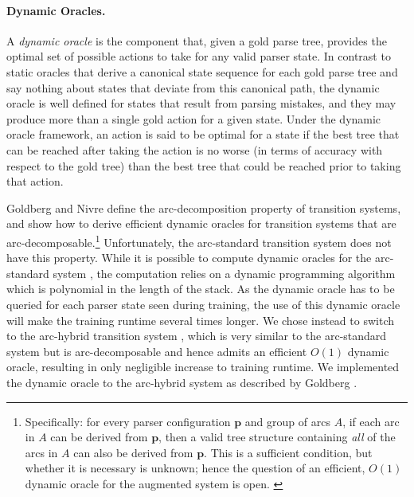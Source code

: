 \documentclass[11pt]{article}
\newcommand{\nascomment}[1]{\textcolor{blue}{\textbf{[#1 --\textsc{nas}]}}}
\newcommand{\ygcomment}[1]{\textcolor{red}{\textbf{[#1 --\textsc{yg}]}}}
\begin{document}
\paragraph{Dynamic Oracles.} A \emph{dynamic oracle} is the component that, given a gold parse tree, 
provides the optimal set of possible actions to take
for any valid parser state.  In contrast to static oracles that derive a
canonical state sequence for each gold parse tree and say nothing about
states that deviate from this canonical path, the dynamic
oracle is well defined for states that result from parsing
mistakes, and they may produce more than a single gold action for a given
state.  Under the dynamic oracle framework, an action is said to be
optimal for a state if the best tree that can be reached after taking the
action is no worse (in terms of accuracy with respect to the gold tree) than the
best tree that could be reached prior to taking that action.

Goldberg and Nivre  define the arc-decomposition
property of transition systems, and show how to derive efficient
dynamic oracles for transition systems that are arc-decomposable.\footnote{Specifically: 
for every parser configuration $\mathbf{p}$ and group of arcs $A$, if
each arc in $A$ can be derived from $\mathbf{p}$, then a valid tree structure
containing \emph{all} of the arcs in $A$ can also be derived from $\mathbf{p}$.
This is a sufficient condition, but whether it is necessary is
unknown; hence the question of an efficient, $O(1)$ dynamic oracle for the augmented system is open. \label{fn:arc-decomposition}}
Unfortunately,
the arc-standard transition system does not have this property.  While it is
possible to compute dynamic oracles for the arc-standard system
\cite{goldberg2013tabular}, the computation relies on a dynamic programming
algorithm which is polynomial in the length of the stack.
As the dynamic oracle has to be queried for each parser state seen during
training, the use of this dynamic oracle will make the training runtime
several times longer.
We chose instead to switch to the arc-hybrid transition system \cite{kuhlmann11dynamic}, 
which is very
similar to the arc-standard system but is arc-decomposable and hence admits an
efficient $O(1)$ dynamic oracle, resulting in only negligible increase
to training runtime.
We implemented the dynamic oracle to the arc-hybrid system as described by
Goldberg .
\end{document}
